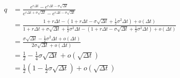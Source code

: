 \documentclass[12pt, letterpaper]{article}
\begin{document}
\begin{align*}
  q &= \frac{e^{r\Delta t} - e^{r\Delta t - \sigma \sqrt{\Delta t}}}{e^{r\Delta t + \sigma \sqrt{\Delta t}} - e^{r\Delta t - \sigma \sqrt{\Delta t}}}\\
  &= \frac{1+r\Delta t - (1 + r \Delta t - \sigma \sqrt{\Delta t} + \frac{1}{2} \sigma^2\Delta t) + o(\Delta t)}
    {1+r\Delta t + \sigma \sqrt{\Delta t} + \frac{1}{2} \sigma^2\Delta t - (1 + r \Delta t - \sigma \sqrt{\Delta t} + \frac{1}{2} \sigma^2\Delta t) + o(\Delta t)} \\
  &= \frac{\sigma \sqrt{\Delta t} - \frac{1}{2} \sigma^2\Delta t + o(\Delta t)}{2\sigma\sqrt{\Delta t} + o(\Delta t)}\\
  &= \frac{1}{2} - \frac{1}{4}\sigma\sqrt{\Delta t} + o(\sqrt{\Delta t}) \\
  &= \frac{1}{2}(1 - \frac{1}{2}\sigma\sqrt{\Delta t}) + o(\sqrt{\Delta t})
\end{align*}

\newpage
\end{document}

